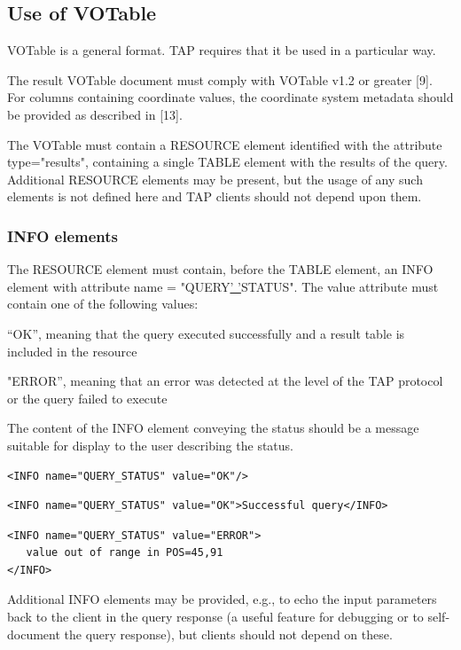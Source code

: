 \documentclass[11pt,a4paper]{ivoa}
\begin{document}
\subsection{Use of VOTable}
VOTable is a general format. TAP requires that it be used in a particular way.

The result VOTable document must comply with VOTable v1.2 or greater [9]. For 
columns containing coordinate values, the coordinate system metadata should be 
provided as described in [13].

The VOTable must contain a RESOURCE element identified with the attribute 
type="results", containing a single TABLE element with the results of the query. 
Additional RESOURCE elements may be present, but the usage of any such elements 
is not defined here and TAP clients should not depend upon them.

\subsubsection{INFO elements}
The RESOURCE element must contain, before the TABLE element, an INFO element 
with attribute name = "QUERY\underline{' '}STATUS". The value attribute must 
contain one of the following values:

“OK”, meaning that the query executed successfully and a result table is 
included in the resource 

"ERROR”, meaning that an error was detected at the level of the TAP 
protocol or the query failed to execute 

The content of the INFO element conveying the status should be a message 
suitable for display to the user describing the status.

\begin{verbatim}
<INFO name="QUERY_STATUS" value="OK"/>
\end{verbatim}
 
\begin{verbatim}
<INFO name="QUERY_STATUS" value="OK">Successful query</INFO>
\end{verbatim}

\begin{verbatim}
<INFO name="QUERY_STATUS" value="ERROR">
   value out of range in POS=45,91
</INFO>
\end{verbatim}

Additional INFO elements may be provided, e.g., to echo the input parameters 
back to the client in the query response (a useful feature for debugging or to 
self-document the query response), but clients should not depend on these. 
\end{document}
